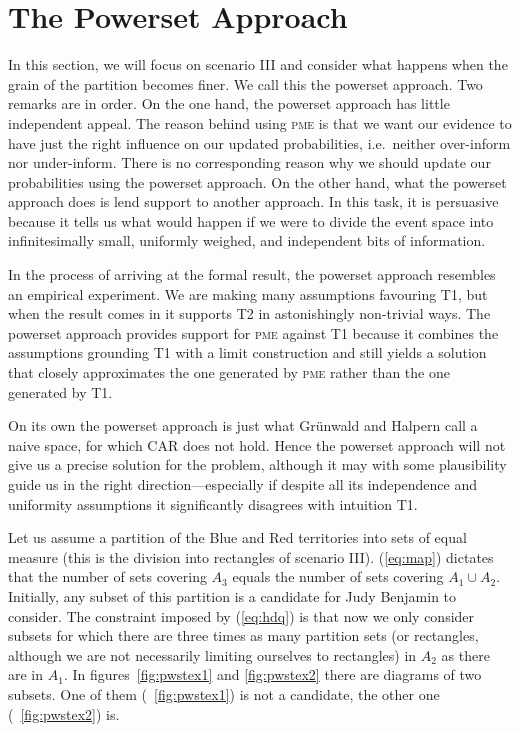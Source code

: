 \documentclass[phd,12pt,oneside]{ubcthesis}
\begin{document}
\section{The Powerset Approach}
\label{sec:eezaitod}

In this section, we will focus on scenario III and consider what
happens when the grain of the partition becomes finer. We call this
the powerset approach. Two remarks are in order. On the one hand, the
powerset approach has little independent appeal. The reason behind
using \textsc{pme} is that we want our evidence to have just the
right influence on our updated probabilities, i.e.\ neither
over-inform nor under-inform. There is no corresponding reason why we
should update our probabilities using the powerset approach. On the
other hand, what the powerset approach does is lend support to another
approach. In this task, it is persuasive because it tells us what
would happen if we were to divide the event space into infinitesimally
small, uniformly weighed, and independent  bits of
information.

In the process of arriving at the formal result, the powerset approach
resembles an empirical experiment. We are making many assumptions
favouring T1, but when the result comes in it supports T2 in
astonishingly non-trivial ways. The powerset approach provides support
for \textsc{pme} against T1 because it combines the assumptions
grounding T1 with a limit construction and still yields a solution
that closely approximates the one generated by \textsc{pme} rather
than the one generated by T1.

On its own the powerset approach is just what Gr{\"u}nwald and Halpern
call a naive space, for which CAR does not hold. Hence the powerset
approach will not give us a precise solution for the problem, although
it may with some plausibility guide us in the right
direction---especially if despite all its independence and uniformity
assumptions it significantly disagrees with intuition T1.

Let us assume a partition of the Blue and Red territories into sets of
equal measure (this is the division into rectangles of scenario III).
({\ref{eq:map}}) dictates that the number of sets covering $A_{3}$
equals the number of sets covering $A_{1}\cup{}A_{2}$. Initially, any
subset of this partition is a candidate for Judy Benjamin to consider.
The constraint imposed by ({\ref{eq:hdq}}) is that now we only
consider subsets for which there are three times as many partition
sets (or rectangles, although we are not necessarily limiting
ourselves to rectangles) in $A_{2}$ as there are in $A_{1}$. In
figures~\ref{fig:pwstex1} and \ref{fig:pwstex2} there are diagrams of
two subsets. One of them ({\igure}~\ref{fig:pwstex1}) is not a
candidate, the other one ({\igure}~\ref{fig:pwstex2}) is.
\end{document}
